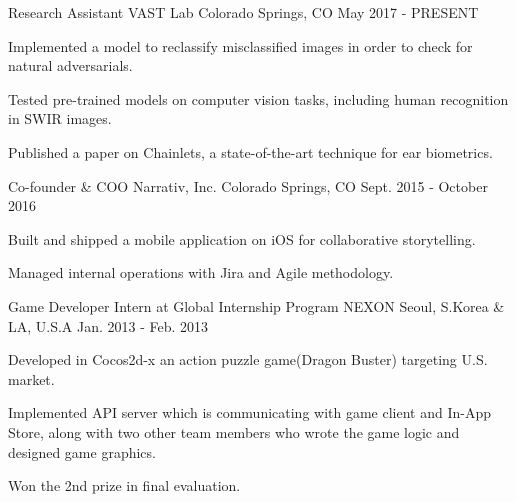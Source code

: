 

\begin{cventries}

  \cventry
    {Research Assistant} %
    {VAST Lab} %
    {Colorado Springs, CO} %
    {May 2017 - PRESENT} %
    {
      \begin{cvitems} %
        \item {Implemented a model to reclassify misclassified images in order to check for natural adversarials.}
        \item {Tested pre-trained models on computer vision tasks, including human recognition in SWIR images.}
        \item {Published a paper on Chainlets, a state-of-the-art technique for ear biometrics.}
      \end{cvitems}
    }

  \cventry
    {Co-founder \& COO} %
    {Narrativ, Inc.} %
    {Colorado Springs, CO} %
    {Sept. 2015 - October 2016} %
    {
      \begin{cvitems} %
        \item {Built and shipped a mobile application on iOS for collaborative storytelling. }
        \item {Managed internal operations with Jira and Agile methodology. }
        \item {}
      \end{cvitems}
    }

  \cventry
    {Game Developer Intern at Global Internship Program} %
    {NEXON} %
    {Seoul, S.Korea \& LA, U.S.A} %
    {Jan. 2013 - Feb. 2013} %
    {
      \begin{cvitems} %
        \item {Developed in Cocos2d-x an action puzzle game(Dragon Buster) targeting U.S. market.}
        \item {Implemented API server which is communicating with game client and In-App Store, along with two other team members who wrote the game logic and designed game graphics.}
        \item {Won the 2nd prize in final evaluation.}
      \end{cvitems}
    }


\end{cventries}
